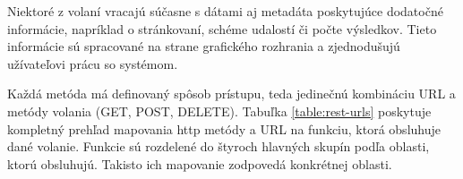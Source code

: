 	Niektoré z volaní vracajú súčasne s dátami aj metadáta poskytujúce dodatočné informácie, napríklad o stránkovaní, schéme udalostí či počte výsledkov. Tieto informácie sú spracované na strane grafického rozhrania a zjednodušujú užívateľovi prácu so systémom.
	
	Každá metóda má definovaný spôsob prístupu, teda jedinečnú kombináciu URL a metódy volania (GET, POST, DELETE). Tabuľka \ref{table:rest-urls} poskytuje kompletný prehľad mapovania http metódy a URL na funkciu, ktorá obsluhuje dané volanie.	Funkcie sú rozdelené do štyroch hlavných skupín podľa oblasti, ktorú obsluhujú. Takisto ich mapovanie zodpovedá konkrétnej oblasti.
	

